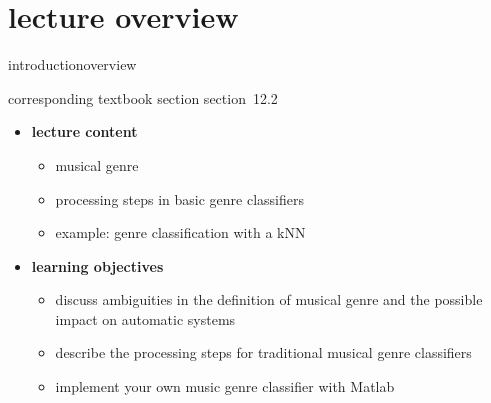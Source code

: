 


\subtitle{Module 12.2: Musical Genre Classification}


	

    \section[overview]{lecture overview}
        \begin{frame}{introduction}{overview}
            \begin{block}{corresponding textbook section}
                    section~12.2
            \end{block}

            \begin{itemize}
                \item   \textbf{lecture content}
                    \begin{itemize}
                        \item   musical genre
                        \item   processing steps in basic genre classifiers
                        \item   example: genre classification with a kNN
                    \end{itemize}
                \bigskip
                \item<2->   \textbf{learning objectives}
                    \begin{itemize}
                        \item   discuss ambiguities in the definition of musical genre and the possible impact on automatic systems
                        \item   describe the processing steps for traditional musical genre classifiers
                        \item   implement your own music genre classifier with Matlab
                    \end{itemize}
            \end{itemize}
        \end{frame}

